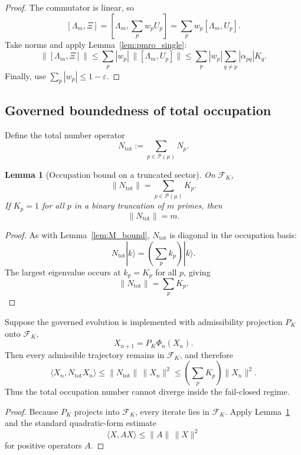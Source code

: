 \documentclass[12pt]{amsart}
\theoremstyle{plain}
\newtheorem{lemma}[theorem]{Lemma}
\begin{document}
\begin{proof}
The commutator is linear, so
\[
[\Lambda_m,\Xi]
=
\left[\Lambda_m,\sum_p w_pU_p\right]
=
\sum_p w_p[\Lambda_m,U_p].
\]
Take norms and apply Lemma~\ref{lem:pmro_single}:
\[
\|[\Lambda_m,\Xi]\|
\le
\sum_p |w_p|\,\|[\Lambda_m,U_p]\|
\le
\sum_p |w_p|
\sum_{q\ne p} |\alpha_{pq}|K_q.
\]
Finally, use \(\sum_p |w_p|\le 1-\varepsilon\).
\end{proof}

\subsection{Governed boundedness of total occupation}

Define the total number operator
\[
N_{\mathrm{tot}} := \sum_{p\in\mathcal P(\mu)} N_p.
\]

\begin{lemma}[Occupation bound on a truncated sector]
\label{lem:Ntot_bound}
On \(\mathcal F_K\),
\[
\|N_{\mathrm{tot}}\| = \sum_{p\in\mathcal P(\mu)} K_p.
\]
If \(K_p=1\) for all \(p\) in a binary truncation of \(m\) primes, then
\[
\|N_{\mathrm{tot}}\| = m.
\]
\end{lemma}

\begin{proof}
As with Lemma~\ref{lem:M_bound}, \(N_{\mathrm{tot}}\) is diagonal in the occupation basis:
\[
N_{\mathrm{tot}}|k\rangle = \left(\sum_p k_p\right)|k\rangle.
\]
The largest eigenvalue occurs at \(k_p=K_p\) for all \(p\), giving
\[
\|N_{\mathrm{tot}}\|=\sum_p K_p.
\]
\end{proof}

\begin{proposition}
Suppose the governed evolution is implemented with admissibility projection \(P_K\) onto \(\mathcal F_K\),
\[
X_{n+1}=P_K\Phi_n(X_n).
\]
Then every admissible trajectory remains in \(\mathcal F_K\), and therefore
\[
\langle X_n, N_{\mathrm{tot}} X_n\rangle
\le
\|N_{\mathrm{tot}}\|\,\|X_n\|^2
\le
\left(\sum_p K_p\right)\|X_n\|^2.
\]
Thus the total occupation number cannot diverge inside the fail-closed regime.
\end{proposition}

\begin{proof}
Because \(P_K\) projects into \(\mathcal F_K\), every iterate lies in \(\mathcal F_K\). Apply Lemma~\ref{lem:Ntot_bound} and the standard quadratic-form estimate
\[
\langle X,AX\rangle \le \|A\|\,\|X\|^2
\]
for positive operators \(A\).
\end{proof}
\end{document}
